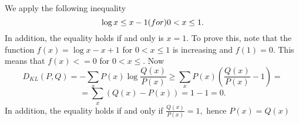 \begin{answer}
We apply the following inequality
$$\log x \le x - 1 \text(for)  0< x\le 1.$$
In addition, the equality holds if and only is $x = 1.$ To prove this,
note that the function $f(x) = \log x - x + 1$ for $0< x \le 1$ is increasing and $f(1) = 0.$
This means that $f(x) <= 0$ for $0< x\le .$
Now
$$D_{KL}(P,Q) = - \sum\limits_x P(x)\log\frac{Q(x)}{P(x)} \ge \sum\limits_x P(x)(\frac{Q(x)}{P(x)} - 1)=$$
$$ = \sum\limits_x (Q(x) - P(x)) = 1- 1 = 0.$$
In addition, the equality holds if and only if $\frac{Q(x)}{P(x)} = 1,$ hence $P(x) = Q(x)$
\end{answer}
